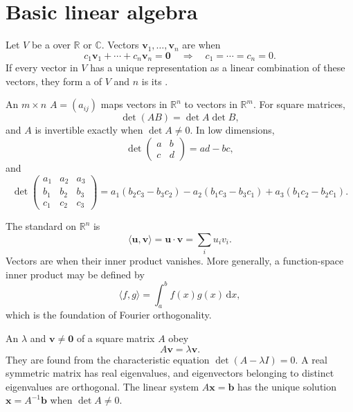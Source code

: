 \section{Basic linear algebra}

Let $V$ be a  over $\mathbb{R}$ or $\mathbb{C}$. Vectors $\mathbf{v}_1,\ldots,\mathbf{v}_n$ are  when
\begin{equation}
c_1\mathbf{v}_1+\cdots+c_n\mathbf{v}_n=\mathbf{0}
\quad\Rightarrow\quad c_1=\cdots=c_n=0.
\end{equation}
If every vector in $V$ has a unique representation as a linear combination of these vectors, they form a  of $V$ and $n$ is its .

An $m\times n$  $A=(a_{ij})$ maps vectors in $\mathbb{R}^n$ to vectors in $\mathbb{R}^m$. For square matrices,
\begin{equation}
\det(AB)=\det A\det B,
\end{equation}
and $A$ is invertible exactly when $\det A\ne0$. In low dimensions,
\begin{equation}
\det\begin{pmatrix}a&b\\c&d\end{pmatrix}=ad-bc,
\end{equation}
and
\begin{equation}
\det\begin{pmatrix}a_1&a_2&a_3\\b_1&b_2&b_3\\c_1&c_2&c_3\end{pmatrix}
=a_1(b_2c_3-b_3c_2)-a_2(b_1c_3-b_3c_1)+a_3(b_1c_2-b_2c_1).
\end{equation}

The standard  on $\mathbb{R}^n$ is
\begin{equation}
\langle\mathbf{u},\mathbf{v}\rangle=\mathbf{u}\cdot\mathbf{v}=\sum_i u_iv_i.
\end{equation}
Vectors are  when their inner product vanishes. More generally, a function-space inner product may be defined by
\begin{equation}
\langle f,g\rangle=\int_a^b f(x)g(x)\,\mathrm{d}x,
\end{equation}
which is the foundation of Fourier orthogonality.

An  $\lambda$ and  $\mathbf{v}\ne\mathbf{0}$ of a square matrix $A$ obey
\begin{equation}
A\mathbf{v}=\lambda\mathbf{v}.
\end{equation}
They are found from the characteristic equation $\det(A-\lambda I)=0$. A real symmetric matrix has real eigenvalues, and eigenvectors belonging to distinct eigenvalues are orthogonal. The linear system $A\mathbf{x}=\mathbf{b}$ has the unique solution $\mathbf{x}=A^{-1}\mathbf{b}$ when $\det A\ne0$.


